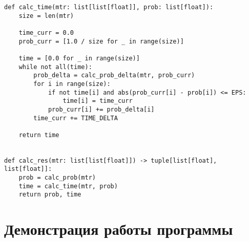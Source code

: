 \begin{lstlisting}
def calc_time(mtr: list[list[float]], prob: list[float]):
	size = len(mtr)
	
	time_curr = 0.0
	prob_curr = [1.0 / size for _ in range(size)]
	
	time = [0.0 for _ in range(size)]
	while not all(time):
		prob_delta = calc_prob_delta(mtr, prob_curr)
		for i in range(size):
			if not time[i] and abs(prob_curr[i] - prob[i]) <= EPS:
				time[i] = time_curr
			prob_curr[i] += prob_delta[i]
		time_curr += TIME_DELTA
		
	return time


def calc_res(mtr: list[list[float]]) -> tuple[list[float], list[float]]:
	prob = calc_prob(mtr)
	time = calc_time(mtr, prob)
	return prob, time
\end{lstlisting}

\clearpage

\section*{Демонстрация работы программы}



\clearpage








